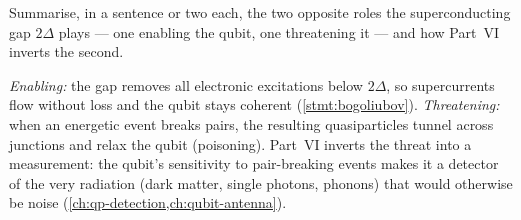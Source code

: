 \begin{exercise}
Summarise, in a sentence or two each, the two opposite roles the
superconducting gap $2\Delta$ plays --- one enabling the qubit, one
threatening it --- and how Part~VI inverts the second.
\begin{solution}
\emph{Enabling:} the gap removes all electronic excitations below
$2\Delta$, so supercurrents flow without loss and the qubit stays
coherent (\cref{stmt:bogoliubov}). \emph{Threatening:} when an energetic
event breaks pairs, the resulting quasiparticles tunnel across junctions
and relax the qubit (poisoning). Part~VI inverts the threat into a
measurement: the qubit's sensitivity to pair-breaking events makes it a
detector of the very radiation (dark matter, single photons, phonons)
that would otherwise be noise (\cref{ch:qp-detection,ch:qubit-antenna}).
\end{solution}
\end{exercise}
